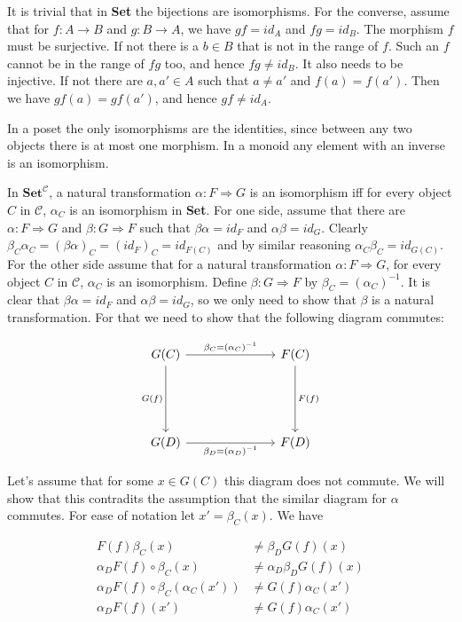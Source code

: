 It is trivial that in \textbf{Set} the bijections are isomorphisms. For the converse, assume that for $f:A\to B$ and $g:B\to A$, we have $gf=id_A$ and $fg=id_B$. The morphism $f$ must be surjective. If not there is a $b\in B$ that is not in the range of $f$. Such an $f$ cannot be in the range of $fg$ too, and hence $fg\neq id_B$. It also needs to be injective. If not there are $a,a'\in A$ such that $a\neq a'$ and $f(a)=f(a')$. Then we have $gf(a)=gf(a')$, and hence $gf\neq id_A$.

In a poset the only isomorphisms are the identities, since between any two objects there is at most one morphism. In a monoid any element with an inverse is an isomorphism.

In $\textbf{Set}^\mathcal{C}$, a natural transformation $\alpha:F\Rightarrow G$ is an isomorphism iff for every object $C$ in $\mathcal{C}$, $\alpha_C$ is an isomorphism in \textbf{Set}. For one side, assume that there are $\alpha:F\Rightarrow G$ and $\beta:G\Rightarrow F$ such that $\beta\alpha=id_F$ and $\alpha\beta=id_G$. Clearly $\beta_C\alpha_C=(\beta\alpha)_C=(id_F)_C=id_{F(C)}$ and by similar reasoning $\alpha_C\beta_C=id_{G(C)}$. For the other side assume that for a natural transformation $\alpha:F\Rightarrow G$, for every object $C$ in $\mathcal{C}$, $\alpha_C$ is an isomorphism. Define $\beta:G\Rightarrow F$ by $\beta_C=(\alpha_C)^{-1}$. It is clear that $\beta\alpha=id_F$ and $\alpha\beta=id_G$, so we only need to show that $\beta$ is a natural transformation.
For that we need to show that the following diagram commutes:

\[\begin{tikzcd}
	{G(C)} &&& {F(C)} \\
	\\
	\\
	{G(D)} &&& {F(D)}
	\arrow["{\beta_C=(\alpha_C)^{-1}}", from=1-1, to=1-4]
	\arrow["{F(f)}", from=1-4, to=4-4]
	\arrow["{G(f)}"', from=1-1, to=4-1]
	\arrow["{\beta_D=(\alpha_D)^{-1}}"', from=4-1, to=4-4]
\end{tikzcd}\]

Let's assume that for some $x\in G(C)$ this diagram does not commute. We will show that this contradits the assumption that the similar diagram for $\alpha$ commutes. For ease of notation let $x'=\beta_C(x)$. We have

\begin{align*}
F(f)\beta_C(x)&\neq\beta_DG(f)(x)\\
\alpha_DF(f)\circ\beta_C(x)&\neq\alpha_D\beta_DG(f)(x)\\
\alpha_DF(f)\circ\beta_C(\alpha_C(x'))&\neq G(f)\alpha_C(x')\\
\alpha_DF(f)(x')&\neq G(f)\alpha_C(x')
\end{align*}
